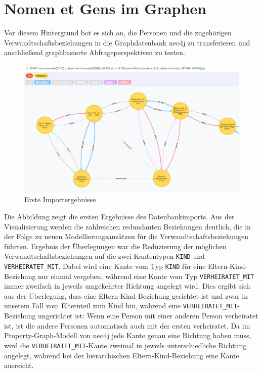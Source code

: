 \documentclass[ngerman,]{scrreprt}
\begin{document}
\section{Nomen et Gens im Graphen}\label{nomen-et-gens-im-graphen}

Vor diesem Hintergrund bot es sich an, die Personen und die zugehörigen Verwandtschaftsbeziehungen in die Graphdatenbank neo4j zu transferieren und anschließend graphbasierte Abfrageperspektiven zu testen.

\begin{figure}
\centering
\includegraphics{Bilder/NeG/020-Verwandschaften.jpg}
\caption{Erste Importergebnisse}
\end{figure}

Die Abbildung zeigt die ersten Ergebnisse des Datenbankimports. Aus der Visualisierung werden die zahlreichen redundanten Beziehungen deutlich, die in der Folge zu neuen Modellierungsansätzen für die Verwandtschaftsbeziehungen führten. Ergebnis der Überlegungen war die Reduzierung der möglichen Verwandtschaftsbeziehungen auf die zwei Kantentypen \texttt{KIND} und \texttt{VERHEIRATET\_MIT}. Dabei wird eine Kante vom Typ \texttt{KIND} für eine Eltern-Kind-Beziehung nur einmal vergeben, während eine Kante vom Typ \texttt{VERHEIRATET\_MIT} immer zweifach in jeweils umgekehrter Richtung angelegt wird. Dies ergibt sich aus der Überlegung, dass eine Eltern-Kind-Beziehung gerichtet ist und zwar in unserem Fall vom Elternteil zum Kind hin, während eine \texttt{VERHEIRATET\_MIT}-Beziehung ungerichtet ist: Wenn eine Person mit einer anderen Person verheiratet ist, ist die andere Personen automatisch auch mit der ersten verheiratet. Da im Property-Graph-Modell von neo4j jede Kante genau eine Richtung haben muss, wird die \texttt{VERHEIRATET\_MIT}-Kante zweimal in jeweils unterschiedliche Richtung angelegt, während bei der hierarchischen Eltern-Kind-Beziehung eine Kante ausreicht.
\end{document}
